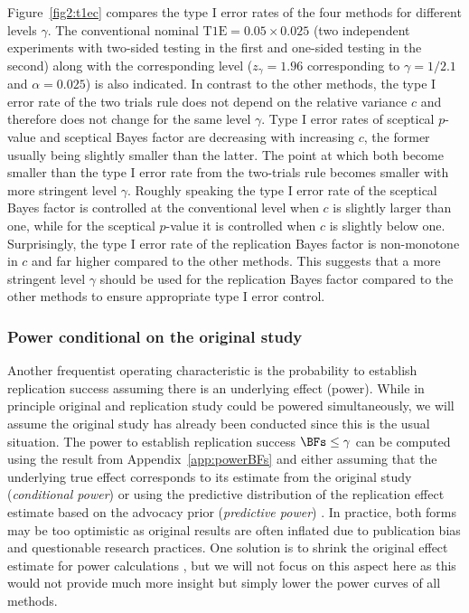 Figure~\ref{fig2:t1ec} compares the type I error rates of the four methods for
different levels $\gamma$. The conventional nominal
$\text{T1E} = 0.05 \times 0.025$ (two independent experiments with two-sided
testing in the first and one-sided testing in the second) along with the
corresponding level ($z_{\gamma} = 1.96$ corresponding to $\gamma = 1/2.1$ and
$\alpha = 0.025$) is also indicated. In contrast to the other methods, the type
I error rate of the two trials rule does not depend on the relative variance $c$
and therefore does not change for the same level $\gamma$. Type I error rates of
sceptical $p$-value and sceptical Bayes factor are decreasing with increasing
$c$, the former usually being slightly smaller than the latter. The point at
which both become smaller than the type I error rate from the two-trials rule
becomes smaller with more stringent level $\gamma$. Roughly speaking the type I
error rate of the sceptical Bayes factor is controlled at the conventional level
when $c$ is slightly larger than one, while for the sceptical $p$-value it is
controlled when $c$ is slightly below one. Surprisingly, the type I error rate
of the replication Bayes factor is non-monotone in $c$ and far higher compared
to the other methods. This suggests that a more stringent level $\gamma$ should
be used for the replication Bayes factor compared to the other methods to ensure
appropriate type I error control.


\subsubsection{Power conditional on the original study}
Another frequentist operating characteristic is the probability to establish
replication success assuming there is an underlying effect (power). While in
principle original and replication study could be powered simultaneously, we
will assume the original study has already been conducted since this is the
usual situation. The power to establish replication success $\BFs \leq \gamma$
can be computed using the result from Appendix~\ref{app:powerBFs} and either
assuming that the underlying true effect corresponds to its estimate from the
original study (\emph{conditional power}) or using the predictive distribution
of the replication effect estimate based on the advocacy prior (\emph{predictive
  power}) \citep{Spiegelhalter1986b, Micheloud2020}. In practice, both forms may
be too optimistic as original results are often inflated due to publication bias
and questionable research practices. One solution is to shrink the original
effect estimate for power calculations \citep{Pawel2020, Held2021}, but we will
not focus on this aspect here as this would not provide much more insight but
simply lower the power curves of all methods.

